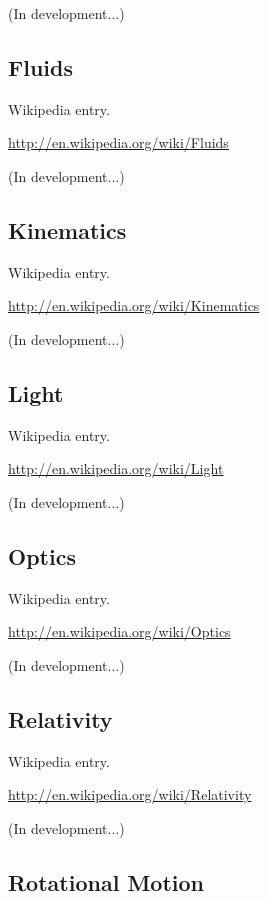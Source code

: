 \documentclass[12pt,twoside]{book}
\begin{document}
(In development...)

\subsection[Fluids]{Fluids}

Wikipedia entry.

\href{http://en.wikipedia.org/wiki/Fluids}{http://en.wikipedia.org/wiki/Fluids}

(In development...)

\subsection[Kinematics]{Kinematics}

Wikipedia entry.

\href{http://en.wikipedia.org/wiki/Kinematics}{http://en.wikipedia.org/wiki/Kinematics}

(In development...)

\subsection[Light]{Light}

Wikipedia entry.

\href{http://en.wikipedia.org/wiki/Light}{http://en.wikipedia.org/wiki/Light}

(In development...)

\subsection[Optics]{Optics}

Wikipedia entry.

\href{http://en.wikipedia.org/wiki/Optics}{http://en.wikipedia.org/wiki/Optics}

(In development...)

\subsection[Relativity]{Relativity}

Wikipedia entry.

\href{http://en.wikipedia.org/wiki/Relativity}{http://en.wikipedia.org/wiki/Relativity}

(In development...)

\subsection[Rotational Motion]{Rotational Motion}
\end{document}
